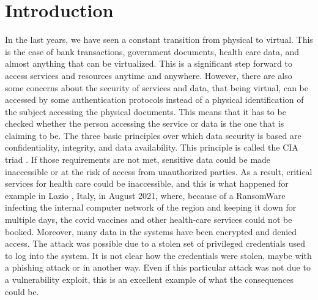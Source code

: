 \chapter{Introduction}
\label{chap:introduction}
In the last years, we have seen a constant transition from physical to virtual. This is the case of bank transactions, government documents, health care data, and almost anything that can be virtualized. This is a significant step forward to access services and resources anytime and anywhere. However, there are also some concerns about the security of services and data, that being virtual, can be accessed by some authentication protocols instead of a physical identification of the subject accessing the physical documents. This means that it has to be checked whether the person accessing the service or data is the one that is claiming to be. The three basic principles over which data security is based are confidentiality, integrity, and data availability. This principle is called the CIA triad \cite{cia_triad}.
If those requirements are not met, sensitive data could be made inaccessible or at the risk of access from unauthorized parties. As a result, critical services for health care could be inaccessible, and this is what happened for example in Lazio \cite{lazio_hacker_0,lazio_hacker_1}, Italy, in August 2021, where, because of a RansomWare infecting the internal computer network of the region and keeping it down for multiple days, the covid vaccines and other health-care services could not be booked. Moreover, many data in the systems have been encrypted and denied access. The attack was possible due to a stolen set of privileged credentials used to log into the system. It is not clear how the credentials were stolen, maybe with a phishing attack or in another way. Even if this particular attack was not due to a vulnerability exploit, this is an excellent example of what the consequences could be. 


